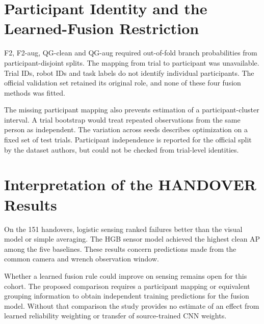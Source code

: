 \section{Participant Identity and the Learned-Fusion Restriction}
F2, F2-aug, QG-clean and QG-aug required out-of-fold branch probabilities from
participant-disjoint splits. The mapping from trial to participant was unavailable.
Trial IDs, robot IDs and task labels do not identify individual participants. The
official validation set retained its original role, and none of these four fusion
methods was fitted.

The missing participant mapping also prevents estimation of a participant-cluster
interval. A trial bootstrap would treat repeated observations from the same person as
independent. The variation across seeds describes optimization on a fixed set of test
trials. Participant independence is reported for the official split by the dataset
authors, but could not be checked from trial-level identities.

\section{Interpretation of the HANDOVER Results}
On the 151 handovers, logistic sensing ranked failures better than the visual model or
simple averaging. The HGB sensor model achieved the highest clean AP among the five
baselines. These results concern predictions made from the common camera and wrench
observation window.

Whether a learned fusion rule could improve on sensing remains open for this cohort. The
proposed comparison requires a participant mapping or equivalent grouping information to
obtain independent training predictions for the fusion model. Without that comparison
the study provides no estimate of an effect from learned reliability weighting or
transfer of source-trained CNN weights.
